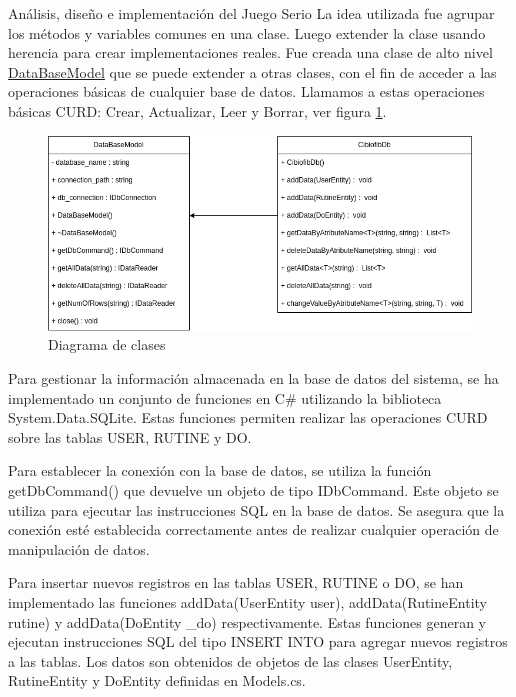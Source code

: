 \begin{thesischapter}{2} {Análisis, diseño e implementación del Juego Serio}
    \vspace{10pt}
    La idea utilizada fue agrupar los métodos y variables comunes en una clase. Luego extender la clase usando herencia para 
    crear implementaciones reales. Fue creada una clase de alto nivel \underline{DataBaseModel} que se puede extender a otras clases, con el 
    fin de acceder a las operaciones básicas de cualquier base de datos. Llamamos a estas operaciones básicas CURD: Crear, 
    Actualizar, Leer y Borrar, ver figura \ref{fig: diagram-db}.
    \begin{figure}[ht]
        \centering
        \includegraphics[scale=0.5]{images/diagram-db.png}
        \caption{Diagrama de clases}
        \label{fig: diagram-db}
    \end{figure}

    Para gestionar la información almacenada en la base de datos del sistema, se ha implementado un conjunto de funciones en C\# utilizando la biblioteca 
    System.Data.SQLite. Estas funciones permiten realizar las operaciones CURD sobre las tablas USER, RUTINE y DO.
    
    
    Para establecer la conexión con la base de datos, se utiliza la función getDbCommand() que devuelve un objeto de tipo IDbCommand. Este objeto se utiliza para ejecutar las instrucciones SQL en 
    la base de datos. Se asegura que la conexión esté establecida correctamente antes de realizar cualquier operación de manipulación de datos.

    Para insertar nuevos registros en las tablas USER, RUTINE o DO, se han implementado las funciones addData(UserEntity user), addData(RutineEntity rutine) y addData(DoEntity \_do) respectivamente. 
    Estas funciones generan y ejecutan instrucciones SQL del tipo INSERT INTO para agregar nuevos registros a las tablas. Los datos son obtenidos de objetos de las clases UserEntity, RutineEntity y DoEntity
    definidas en Models.cs.


\end{thesischapter}
